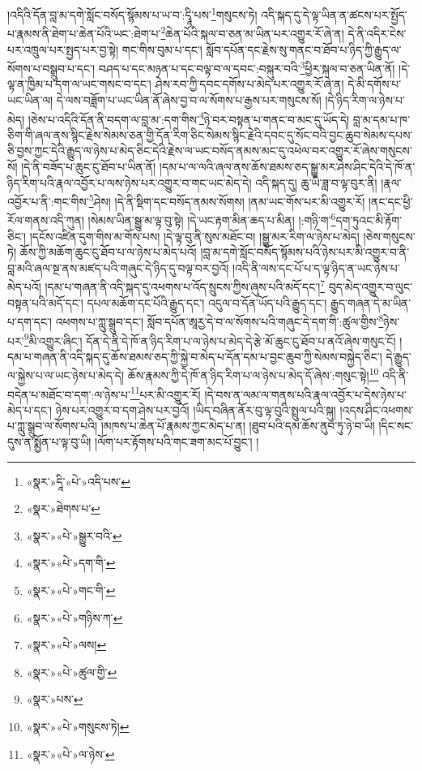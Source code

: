 །འདིའི་དོན་བླ་མ་དགེ་སློང་བསོད་སྙོམས་པ་ཡ་བ་:དྭཱི་པས་\footnote{«སྣར་»དཱི་«པེ་»འདི་པས་}གསུངས་ཏེ། འདི་སྐད་དུ་དེ་ལྟ་ཡིན་ན་ཚངས་པར་སྤྱོད་པ་རྣམས་ནི་ཐེག་པ་ཆེན་པོའི་ཡང་:ཐེག་པ་\footnote{«སྣར་»ཐེགས་པ་}ཆེན་པོའི་སྐལ་བ་ཅན་མ་ཡིན་པར་འགྱུར་རོ་ཞེ་ན། དེ་ནི་འདིར་ངེས་པར་འཁྲུལ་པར་སྤྱད་པར་བྱ་སྟེ། གང་གིས་བུམ་པ་དང་། སློབ་དཔོན་དང་རྗེས་སུ་གནང་བ་ཐོབ་པ་ཉིད་ཀྱི་རྒྱུད་ལ་སོགས་པ་བསྒྲུབ་པ་དང་། བཤད་པ་དང་མཉན་པ་དང་བལྟ་བ་ལ་དབང་:བསྐུར་བའི་\footnote{«སྣར་»«པེ་»སྒྱུར་བའི་}ཕྱིར་སྐལ་བ་ཅན་ཡིན་ནོ། །དེ་ལྟ་ན་ཁྱིམ་པ་དག་ལ་ཡང་གསང་བ་དང་། ཤེས་རབ་ཀྱི་དབང་དགོས་པ་མེད་པར་འགྱུར་རོ་ཞེ་ན། དེ་མི་དགོས་པ་ཡང་ཡིན་ལ། དེ་ལས་བཟློག་པ་ཡང་ཡིན་ནོ་ཞེས་བྱ་བ་ལ་སོགས་པ་རྒྱས་པར་གསུངས་སོ། །དེ་ཉིད་རིག་ལ་ཉེས་པ་མེད། །ཅེས་པ་འདིའི་དོན་ནི་བདག་ལ་བླ་མ་:དག་གིས་\footnote{«སྣར་»«པེ་»དག་གི་}ཉེ་བར་བསྟན་པ་གནང་བ་མང་དུ་ཡོད་དེ། བླ་མ་དམ་པ་ཁ་ཅིག་གི་ཞལ་ནས་སྙིང་རྗེས་སེམས་ཅན་གྱི་དོན་རིག་ཅིང་སེམས་སྙིང་རྗེའི་དབང་དུ་སོང་བའི་བྱང་ཆུབ་སེམས་དཔས་ཅི་བྱས་ཀྱང་དེའི་རྒྱུད་ལ་ཉེས་པ་མེད་ཅིང་དེའི་རྗེས་ལ་ཡང་བསོད་ནམས་མང་དུ་འཕེལ་བར་འགྱུར་རོ་ཞེས་གསུངས་སོ། །དེ་ནི་བཟོད་པ་ཆུང་ངུ་ཐོབ་པ་ཡིན་ནོ། །དམ་པ་ལ་ལའི་ཞལ་ནས་ཆོས་ཐམས་ཅད་སྒྱུ་མར་ཤེས་ཤིང་དེའི་དེ་ཁོ་ན་ཉིད་རིག་པའི་རྣལ་འབྱོར་པ་ལས་ཉེས་པར་འགྱུར་བ་གང་ཡང་མེད་དེ། འདི་སྐད་དུ། ཆུ་ཡི་ཟླ་བ་ལྟ་བུར་ནི། །རྣལ་འབྱོར་པ་ནི་:གང་གིས་\footnote{«སྣར་»«པེ་»གང་གི་}ཤེས། །དེ་ནི་སྡིག་དང་བསོད་ནམས་སོགས། །ནམ་ཡང་གོས་པར་མི་འགྱུར་རོ། །ནང་དང་ཕྱི་རོལ་གནས་འདི་ཀུན། །སེམས་ཡིན་སྒྱུ་མ་ལྟ་བུ་སྟེ། །དེ་ཡང་རྟག་མིན་ཆད་པ་མིན། །:གཉི་ག་\footnote{«སྣར་»«པེ་»གཉིས་ཀ་}དག་ཏུའང་མི་རྟོག་ཅིང་། །དངོས་འཛིན་དུག་གིས་མ་གོས་པས། །དེ་ལྟ་བུ་ནི་སུས་མཐོང་བ། །སྒྱུ་མར་རིག་ལ་ཉེས་པ་མེད། །ཅེས་གསུངས་ཏེ། ཆོས་ཀྱི་མཆོག་ཆུང་ངུ་ཐོབ་པ་ལ་ཉེས་པ་མེད་པའོ། །བླ་མ་དགེ་སློང་བསོད་སྙོམས་པའི་ཉེས་པར་མི་འགྱུར་བ་ནི་བླ་མའི་ཞལ་སྔ་ནས་མཛད་པའི་གཞུང་དེ་ཉིད་དུ་བལྟ་བར་བྱའོ། །འདི་ནི་ལས་དང་པོ་པ་ད་ལྟ་ཉིད་ན་ཡང་ཉེས་པ་མེད་པའོ། །དམ་པ་གཞན་ནི་འདི་སྐད་དུ་འཕགས་པ་འོད་སྲུངས་ཀྱིས་ཞུས་པའི་མདོ་དང་།\footnote{«སྣར་»«པེ་»ལས།} བུད་མེད་འགྱུར་བ་ལུང་བསྟན་པའི་མདོ་དང་། དཔལ་མཆོག་དང་པོའི་རྒྱུད་དང་། འདུལ་བ་དོན་ཡོད་པའི་རྒྱུད་དང་། རྒྱུད་གཞན་དེ་མ་ཡིན་པ་དག་དང་། འཕགས་པ་ཀླུ་སྒྲུབ་དང་། སློབ་དཔོན་ཨཱརྱ་དེ་བ་ལ་སོགས་པའི་གཞུང་དེ་དག་གི་:ཚུལ་གྱིས་\footnote{«སྣར་»«པེ་»ཚུལ་གྱི་}ཉེས་པར་\footnote{«སྣར་»པས་}མི་འགྱུར་ཞིང་། དོན་དེ་ནི་དེ་ཁོ་ན་ཉིད་རིག་པ་ལ་ཉེས་པ་མེད་དེ་རྩེ་མོ་ཆུང་ངུ་ཐོབ་པ་ནའོ་ཞེས་གསུང་ངོ། །དམ་པ་གཞན་ནི་འདི་སྐད་དུ་ཆོས་ཐམས་ཅད་ཀྱི་སྐྱེ་བ་མེད་པ་དོན་དམ་པ་བྱང་ཆུབ་ཀྱི་སེམས་བསྐྱེད་ཅིང་། དེ་རྒྱུད་ལ་སྐྱེས་པ་ལ་ཡང་ཉེས་པ་མེད་དེ། ཆོས་རྣམས་ཀྱི་དེ་ཁོ་ན་ཉིད་རིག་པ་ལ་ཉེས་པ་མེད་དོ་ཞེས་:གསུང་སྟེ།\footnote{«སྣར་»«པེ་»གསུངས་ཏེ།} འདི་ནི་བདེན་པ་མཐོང་བ་དག་:ལ་ཉེས་པ་\footnote{«སྣར་»«པེ་»ལ་ཉེས་}པར་མི་འགྱུར་རོ། །དེ་བས་ན་ལམ་ལ་གནས་པའི་རྣལ་འབྱོར་པ་དེས་ཉེས་པ་མེད་པ་དང་། ཉེས་པར་འགྱུར་བ་དག་ཤེས་པར་བྱའོ། །ཡིད་བཞིན་ནོར་བུ་ལྟ་བུའི་སྤྲུལ་པའི་སྐུ། །འདས་ཤིང་འཕགས་པ་ཀླུ་སྒྲུབ་ལ་སོགས་པའི། །མཁས་པ་ཆེན་པོ་རྣམས་ཀྱང་མེད་པ་ན། །ཐུབ་པའི་དམ་ཆོས་ནུབ་ཏུ་ཉེ་བ་ཡི། །དིང་སང་དུས་ན་སྨྱོན་པ་ལྟ་བུ་ཡི། །ལོག་པར་རྟོགས་པའི་གང་ཟག་མང་པོ་བྱུང་། །
